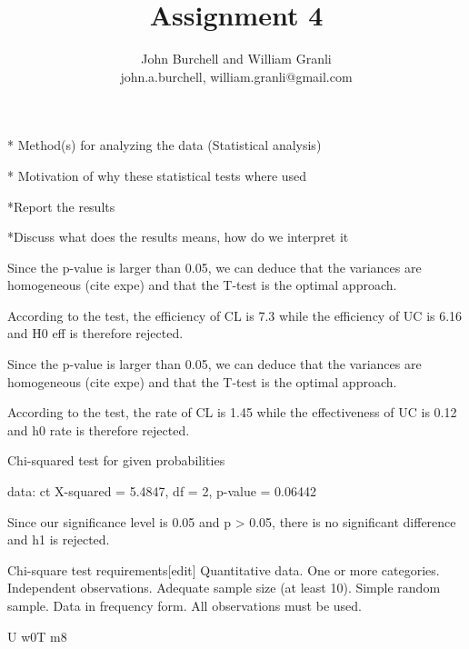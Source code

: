\documentclass[10pt,twocolumn]{article}
\begin{document}
\title{Assignment 4}

\author{John Burchell and William Granli \\
john.a.burchell, william.granli@gmail.com}


\maketitle
\thispagestyle{empty}



* Method(s) for analyzing the data (Statistical analysis)

* Motivation of why these statistical tests where used


*Report the results

*Discuss what does the results means, how do we interpret it




Since the p-value is larger than 0.05, we can deduce that the variances are homogeneous (cite expe) and that the T-test is the optimal approach.



According to the test, the efficiency of CL is 7.3 while the efficiency of UC is 6.16 and H0 eff is therefore rejected. 






Since the p-value is larger than 0.05, we can deduce that the variances are homogeneous (cite expe) and that the T-test is the optimal approach.




According to the test, the rate of CL is 1.45 while the effectiveness of UC is 0.12 and h0 rate is therefore rejected. 


	Chi-squared test for given probabilities

data:  ct
X-squared = 5.4847, df = 2, p-value = 0.06442

Since our significance level is 0.05 and p > 0.05, there is no significant difference and h1 is rejected. 


Chi-square test requirements[edit]
Quantitative data.
One or more categories.
Independent observations.
Adequate sample size (at least 10).
Simple random sample.
Data in frequency form.
All observations must be used.




U w0T m8
\end{document}
